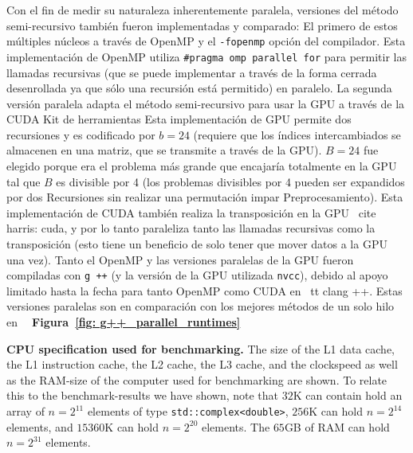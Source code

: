 ﻿\documentclass[10pt]{article}
\begin{document}
{Con el fin de medir su naturaleza inherentemente paralela, versiones del método semi-recursivo también fueron implementadas y comparado: El primero de estos múltiples núcleos a través de OpenMP y el {\tt -fopenmp} opción del compilador. Esta implementación de OpenMP utiliza {\tt \#pragma omp parallel for} para permitir las llamadas recursivas (que se puede implementar a través de la forma cerrada desenrollada ya que sólo una recursión está permitido) en paralelo. La segunda versión paralela adapta el método semi-recursivo para usar la GPU a través de la CUDA Kit de herramientas Esta implementación de GPU permite dos recursiones y es codificado por $ b = 24 $ (requiere que los índices intercambiados se almacenen en una matriz, que se transmite a través de la GPU). $ B = 24 $ fue elegido porque era el problema más grande que encajaría totalmente en la GPU tal que $B$ es divisible por 4 (los problemas divisibles por 4 pueden ser expandidos por dos
Recursiones sin realizar una permutación impar
Preprocesamiento). Esta implementación de CUDA también realiza la
transposición en la GPU \ cite {harris: cuda}, y por lo tanto paraleliza
tanto las llamadas recursivas como la transposición (esto tiene un
beneficio de solo tener que mover datos a la GPU una vez). Tanto el OpenMP
y las versiones paralelas de la GPU fueron compiladas con {\tt g ++} (y la
versión de la GPU utilizada {\tt nvcc}), debido al apoyo limitado hasta la fecha para tanto OpenMP como CUDA en {\ tt clang ++}. Estas versiones paralelas son en comparación con los mejores métodos de un solo hilo en {\bf
  Figura~\ref{fig: g++_parallel_runtimes}}
\begin{table}[ht!]
  \centering
  
\caption{ {\bf CPU specification used for benchmarking.} The size of
  the L1 data cache, the L1 instruction cache, the L2 cache, the L3
  cache, and the clockspeed as well as the RAM-size of the computer
  used for benchmarking are shown. To relate this to the
  benchmark-results we have shown, note that $32$K can contain hold an
  array of $n=2^{11}$ elements of type {\tt std::complex<double>},
  $256$K can hold $n=2^{14}$ elements, and $15360$K can hold $n=2^{20}$
  elements. The $65$GB of RAM can hold $n=2^{31}$ elements. 
  \label{table:cpu_spec}
}
\end{table}

}
\end{document}
